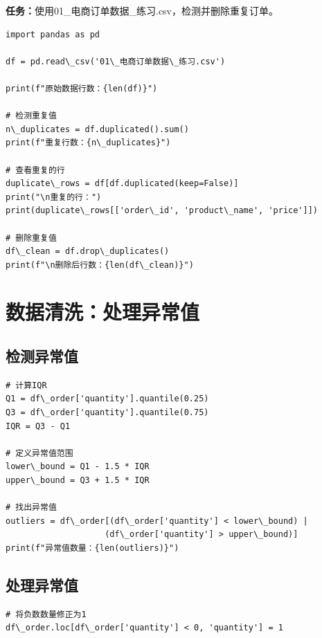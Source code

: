 \documentclass[12pt,a4paper]{article}
\begin{document}
\begin{practicebox}
\textbf{任务：}使用01\_电商订单数据\_练习.csv，检测并删除重复订单。

\begin{lstlisting}
import pandas as pd

df = pd.read\_csv('01\_电商订单数据\_练习.csv')

print(f"原始数据行数：{len(df)}")

# 检测重复值
n\_duplicates = df.duplicated().sum()
print(f"重复行数：{n\_duplicates}")

# 查看重复的行
duplicate\_rows = df[df.duplicated(keep=False)]
print("\n重复的行：")
print(duplicate\_rows[['order\_id', 'product\_name', 'price']])

# 删除重复值
df\_clean = df.drop\_duplicates()
print(f"\n删除后行数：{len(df\_clean)}")
\end{lstlisting}
\end{practicebox}

\section{数据清洗：处理异常值}

\subsection{检测异常值}

\begin{lstlisting}[caption={使用IQR方法检测异常值}]
# 计算IQR
Q1 = df\_order['quantity'].quantile(0.25)
Q3 = df\_order['quantity'].quantile(0.75)
IQR = Q3 - Q1

# 定义异常值范围
lower\_bound = Q1 - 1.5 * IQR
upper\_bound = Q3 + 1.5 * IQR

# 找出异常值
outliers = df\_order[(df\_order['quantity'] < lower\_bound) | 
                    (df\_order['quantity'] > upper\_bound)]
print(f"异常值数量：{len(outliers)}")
\end{lstlisting}

\subsection{处理异常值}

\begin{lstlisting}[caption={处理异常值}]
# 将负数数量修正为1
df\_order.loc[df\_order['quantity'] < 0, 'quantity'] = 1
\end{lstlisting}
\end{document}

